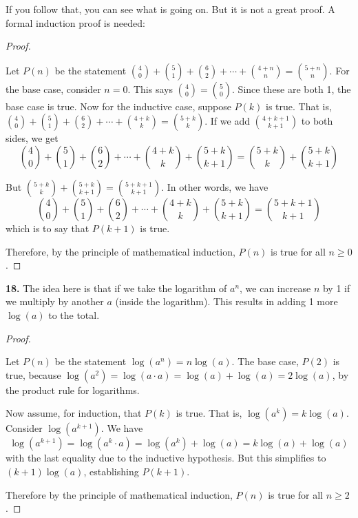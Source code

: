 \documentclass[10pt,]{book}
\theoremstyle{plain}
\theoremstyle{definition}
\theoremstyle{definition}
\theoremstyle{definition}
\numberwithin{equation}{chapter}
\begin{document}
		If you follow that, you can see what is going on. But it is not a great proof. A formal induction proof is needed:
%
\begin{proof}\hypertarget{proof-30}{}

Let \(P(n)\) be the statement \({4 \choose 0} + {5 \choose 1} + {6 \choose 2} + \cdots + {4+n \choose n} = {5+n \choose n}\). For the base case, consider \(n = 0\). This says \({4 \choose 0} = {5 \choose 0}\). Since these are both 1, the base case is true. Now for the inductive case, suppose \(P(k)\) is true. That is, \({4 \choose 0} + {5 \choose 1} + {6 \choose 2} + \cdots + {4+k \choose k} = {5+k \choose k}\). If we add \({4+k+1 \choose k+1}\) to both sides, we get
\begin{equation*}
  {4 \choose 0} + {5 \choose 1} + {6 \choose 2} + \cdots + {4+k \choose k} + {5+k \choose k+1}= {5+k \choose k} + {5+k \choose k+1}
\end{equation*}
%
\par

But \({5+k \choose k} + {5+k \choose k+1} = {5+k+1 \choose k+1}\). In other words, we have
\begin{equation*}
  {4 \choose 0} + {5 \choose 1} + {6 \choose 2} + \cdots + {4+k \choose k} + {5+k \choose k+1} = {5+k+1 \choose k+1}
\end{equation*}
which is to say that \(P(k+1)\) is true.

			Therefore, by the principle of mathematical induction, \(P(n)\) is true for all \(n \ge 0\).
%
\end{proof}
\par\smallskip
\noindent\textbf{18.}\quad{}
The idea here is that if we take the logarithm of \(a^n\), we can increase \(n\) by 1 if we multiply by another \(a\) (inside the logarithm). This results in adding 1 more \(\log(a)\) to the total.
%
\begin{proof}\hypertarget{proof-31}{}

Let \(P(n)\) be the statement \(\log(a^n) = n \log(a)\). The base case, \(P(2)\) is true, because \(\log(a^2) = \log(a\cdot a) = \log(a) + \log(a) = 2\log(a)\), by the product rule for logarithms.

			Now assume, for induction, that \(P(k)\) is true. That is, \(\log(a^k) = k\log(a)\). Consider \(\log(a^{k+1})\). We have
\begin{equation*}
  \log(a^{k+1}) = \log(a^k\cdot a) = \log(a^k) + \log(a) = k\log(a) + \log(a)
\end{equation*}
with the last equality due to the inductive hypothesis. But this simplifies to \((k+1) \log(a)\), establishing \(P(k+1)\).

			Therefore by the principle of mathematical induction, \(P(n)\) is true for all \(n \ge 2\).
%
\end{proof}
\end{document}
